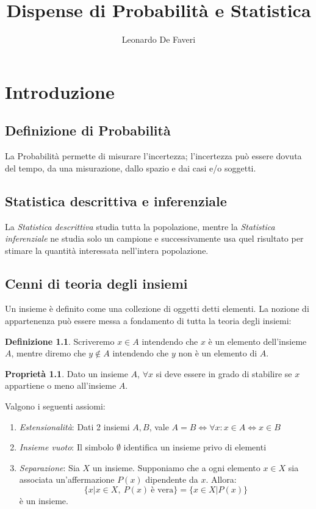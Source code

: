 \documentclass[12pt, a4paper]{report}
\title{Dispense di Probabilità e Statistica}
\author{Leonardo De Faveri}
\date{}
\theoremstyle{definition}
\newtheorem{definition}{Definizione}[section]
\newtheorem*{property}{Proprietà}
\begin{document}
\maketitle
\tableofcontents

\chapter{Introduzione}

\section{Definizione di Probabilità}
La Probabilità permette di misurare l'incertezza; l'incertezza può essere dovuta
del tempo, da una misurazione, dallo spazio e dai casi e/o soggetti.

\section{Statistica descrittiva e inferenziale}
La \emph{Statistica descrittiva} studia tutta la popolazione, mentre la 
\emph{Statistica inferenziale} ne studia solo un campione e successivamente usa 
quel risultato per stimare la quantità interessata nell'intera popolazione.

\section{Cenni di teoria degli insiemi}
Un insieme è definito come una collezione di oggetti detti elementi.\newline
La nozione di appartenenza può essere messa a fondamento di tutta la teoria
degli insiemi:
\begin{definition}
	Scriveremo \(x\in A\) intendendo che $x$ è un elemento dell'insieme $A$,
	mentre diremo che \(y\notin A\) intendendo che $y$ non è un elemento di $A$.
\end{definition}
\begin{property}
	Dato un insieme $A$, $\forall x$ si deve essere in grado di stabilire
	se $x$ appartiene o meno all'insieme $A$.
\end{property}

\noindent
Valgono i seguenti assiomi:
\begin{enumerate}[label=(\roman*)]
	\item \emph{Estensionalità}: Dati 2 insiemi $A, B$, vale \(A=B
	\Leftrightarrow \forall x: x \in A \Leftrightarrow x \in B\)
	\item \emph{Insieme vuoto}: Il simbolo $\emptyset$ identifica un insieme
	privo di elementi
	\item \emph{Separazione}: Sia $X$ un insieme. Supponiamo che a ogni elemento 
	$x\in X$ sia associata un'affermazione $P(x)$ dipendente da $x$. Allora:
	\[ \{x | x\in X,\ P(x)\ \text{è vera} \} = \{x\in X | P(x)\} \]
	è un insieme.
\end{enumerate}
\end{document}
